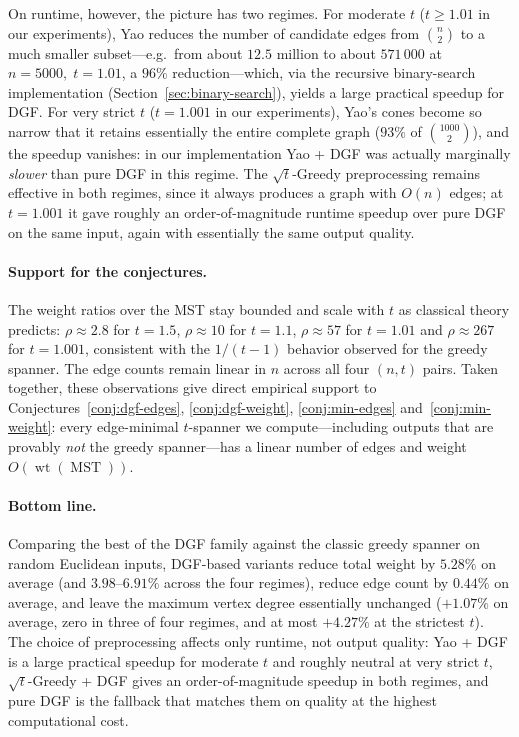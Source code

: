 \documentclass{article}
\DeclareMathOperator{\wt}{wt}
\DeclareMathOperator{\MST}{MST}
\begin{document}
On runtime, however, the picture has two regimes. For moderate $t$
($t\ge 1.01$ in our experiments), Yao reduces the number of candidate
edges from $\binom{n}{2}$ to a much smaller subset---e.g.\ from about
$12.5$ million to about $571\,000$ at $n=5000,\;t=1.01$, a $96\%$
reduction---which, via the recursive binary-search implementation
(Section~\ref{sec:binary-search}), yields a large practical speedup
for DGF. For very strict $t$ ($t=1.001$ in our experiments), Yao's
cones become so narrow that it retains essentially the entire
complete graph ($93\%$ of $\binom{1000}{2}$), and the speedup
vanishes: in our implementation Yao + DGF was actually marginally
\emph{slower} than pure DGF in this regime. The $\sqrt{t}$-Greedy
preprocessing remains effective in both regimes, since it always
produces a graph with $O(n)$ edges; at $t=1.001$ it gave roughly an
order-of-magnitude runtime speedup over pure DGF on the same input,
again with essentially the same output quality.

\paragraph{Support for the conjectures.}
The weight ratios over the MST stay bounded and scale with $t$ as
classical theory predicts: $\rho\approx 2.8$ for $t=1.5$,
$\rho\approx 10$ for $t=1.1$, $\rho\approx 57$ for $t=1.01$ and
$\rho\approx 267$ for $t=1.001$, consistent with the $1/(t-1)$
behavior observed for the greedy spanner. The edge counts remain
linear in $n$ across all four $(n,t)$ pairs. Taken together, these
observations give direct empirical support to
Conjectures~\ref{conj:dgf-edges}, \ref{conj:dgf-weight},
\ref{conj:min-edges} and~\ref{conj:min-weight}: every edge-minimal
$t$-spanner we compute---including outputs that are provably
\emph{not} the greedy spanner---has a linear number of edges and
weight $O(\wt(\MST))$.

\paragraph{Bottom line.}
Comparing the best of the DGF family against the classic greedy
spanner on random Euclidean inputs, DGF-based variants reduce total
weight by $5.28\%$ on average (and $3.98$--$6.91\%$ across the four
regimes), reduce edge count by $0.44\%$ on average, and leave the
maximum vertex degree essentially unchanged ($+1.07\%$ on average,
zero in three of four regimes, and at most $+4.27\%$ at the strictest
$t$). The choice of preprocessing affects only runtime, not output
quality: Yao + DGF is a large practical speedup for moderate $t$ and
roughly neutral at very strict $t$, $\sqrt{t}$-Greedy + DGF gives an
order-of-magnitude speedup in both regimes, and pure DGF is the
fallback that matches them on quality at the highest computational
cost.
\end{document}
